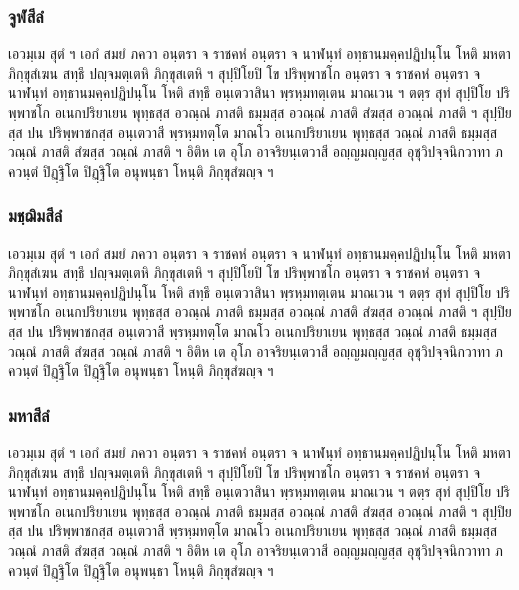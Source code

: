 \documentclass[
]{book}
\begin{document}
\hypertarget{uxe08uxe39uxe2cuxe2auxe35uxe25uxe4d}{%
\subsubsection{จูฬสีลํ}\label{uxe08uxe39uxe2cuxe2auxe35uxe25uxe4d}}

เอวมฺเม สุตํ ฯ เอกํ สมยํ ภควา อนฺตรา จ ราชคหํ อนฺตรา จ นาฬนฺทํ อทฺธานมคฺคปฏิปนฺโน โหติ มหตา ภิกฺขุสํเฆน สทฺธึ ปญฺจมตฺเตหิ ภิกฺขุสเตหิ ฯ สุปฺปิโยปิ โข ปริพฺพาชโก อนฺตรา จ ราชคหํ อนฺตรา จ นาฬนฺทํ อทฺธานมคฺคปฏิปนฺโน โหติ สทฺธึ อนฺเตวาสินา พฺรหฺมทตฺเตน มาณเวน ฯ ตตฺร สุทํ สุปฺปิโย ปริพฺพาชโก อเนกปริยาเยน พุทฺธสฺส อวณฺณํ ภาสติ ธมฺมสฺส อวณฺณํ ภาสติ สํฆสฺส อวณฺณํ ภาสติ ฯ สุปฺปิยสฺส ปน ปริพฺพาชกสฺส อนฺเตวาสี พฺรหฺมทตฺโต มาณโว อเนกปริยาเยน พุทฺธสฺส วณฺณํ ภาสติ ธมฺมสฺส วณฺณํ ภาสติ สํฆสฺส วณฺณํ ภาสติ ฯ อิติห เต อุโภ อาจริยนฺเตวาสี อญฺญมญฺญสฺส อุชุวิปจฺจนิกวาทา ภควนฺตํ ปิฏฺฐิโต ปิฏฺฐิโต อนุพนฺธา โหนฺติ ภิกฺขุสํฆญฺจ ฯ

\hypertarget{uxe21uxe0auxe3auxe0cuxe34uxe21uxe2auxe35uxe25uxe4d}{%
\subsubsection{มชฺฌิมสีลํ}\label{uxe21uxe0auxe3auxe0cuxe34uxe21uxe2auxe35uxe25uxe4d}}

เอวมฺเม สุตํ ฯ เอกํ สมยํ ภควา อนฺตรา จ ราชคหํ อนฺตรา จ นาฬนฺทํ อทฺธานมคฺคปฏิปนฺโน โหติ มหตา ภิกฺขุสํเฆน สทฺธึ ปญฺจมตฺเตหิ ภิกฺขุสเตหิ ฯ สุปฺปิโยปิ โข ปริพฺพาชโก อนฺตรา จ ราชคหํ อนฺตรา จ นาฬนฺทํ อทฺธานมคฺคปฏิปนฺโน โหติ สทฺธึ อนฺเตวาสินา พฺรหฺมทตฺเตน มาณเวน ฯ ตตฺร สุทํ สุปฺปิโย ปริพฺพาชโก อเนกปริยาเยน พุทฺธสฺส อวณฺณํ ภาสติ ธมฺมสฺส อวณฺณํ ภาสติ สํฆสฺส อวณฺณํ ภาสติ ฯ สุปฺปิยสฺส ปน ปริพฺพาชกสฺส อนฺเตวาสี พฺรหฺมทตฺโต มาณโว อเนกปริยาเยน พุทฺธสฺส วณฺณํ ภาสติ ธมฺมสฺส วณฺณํ ภาสติ สํฆสฺส วณฺณํ ภาสติ ฯ อิติห เต อุโภ อาจริยนฺเตวาสี อญฺญมญฺญสฺส อุชุวิปจฺจนิกวาทา ภควนฺตํ ปิฏฺฐิโต ปิฏฺฐิโต อนุพนฺธา โหนฺติ ภิกฺขุสํฆญฺจ ฯ

\hypertarget{uxe21uxe2buxe32uxe2auxe35uxe25uxe4d}{%
\subsubsection{มหาสีลํ}\label{uxe21uxe2buxe32uxe2auxe35uxe25uxe4d}}

เอวมฺเม สุตํ ฯ เอกํ สมยํ ภควา อนฺตรา จ ราชคหํ อนฺตรา จ นาฬนฺทํ อทฺธานมคฺคปฏิปนฺโน โหติ มหตา ภิกฺขุสํเฆน สทฺธึ ปญฺจมตฺเตหิ ภิกฺขุสเตหิ ฯ สุปฺปิโยปิ โข ปริพฺพาชโก อนฺตรา จ ราชคหํ อนฺตรา จ นาฬนฺทํ อทฺธานมคฺคปฏิปนฺโน โหติ สทฺธึ อนฺเตวาสินา พฺรหฺมทตฺเตน มาณเวน ฯ ตตฺร สุทํ สุปฺปิโย ปริพฺพาชโก อเนกปริยาเยน พุทฺธสฺส อวณฺณํ ภาสติ ธมฺมสฺส อวณฺณํ ภาสติ สํฆสฺส อวณฺณํ ภาสติ ฯ สุปฺปิยสฺส ปน ปริพฺพาชกสฺส อนฺเตวาสี พฺรหฺมทตฺโต มาณโว อเนกปริยาเยน พุทฺธสฺส วณฺณํ ภาสติ ธมฺมสฺส วณฺณํ ภาสติ สํฆสฺส วณฺณํ ภาสติ ฯ อิติห เต อุโภ อาจริยนฺเตวาสี อญฺญมญฺญสฺส อุชุวิปจฺจนิกวาทา ภควนฺตํ ปิฏฺฐิโต ปิฏฺฐิโต อนุพนฺธา โหนฺติ ภิกฺขุสํฆญฺจ ฯ
\end{document}
